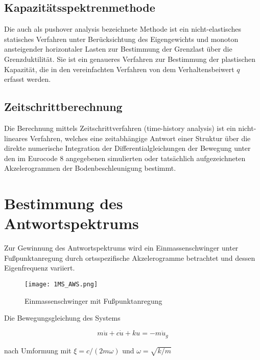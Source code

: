 \subsection{Kapazitätsspektrenmethode}
\label{sec:Kapazitaetsspektrenmethode}

Die auch als \glqq pushover analysis\grqq{} bezeichnete Methode ist ein nicht-elastisches statisches Verfahren unter Berücksichtung des Eigengewichts und monoton ansteigender horizontaler Lasten zur Bestimmung der Grenzlast über die Grenzduktilität.
Sie ist ein genaueres Verfahren zur Bestimmung der plastischen Kapazität, die in den vereinfachten Verfahren von dem Verhaltensbeiwert $q$ erfasst werden.

\subsection{Zeitschrittberechnung}
\label{sec:Zeitschrittberechnung}

Die Berechnung mittels Zeitschrittverfahren (\glqq time-history analysis\grqq{}) ist ein nicht-lineares Verfahren, welches eine zeitabhängige Antwort einer Struktur über die direkte numerische Integration der Differentialgleichungen der Bewegung unter den im Eurocode 8 angegebenen simulierten oder tatsächlich aufgezeichneten Akzelerogrammen der Bodenbeschleunigung bestimmt. 

\pagebreak

\section{Bestimmung des Antwortspektrums}
\label{sec:Antwortspektren}

Zur Gewinnung des Antwortspektrums wird ein Einmassenschwinger unter Fußpunktanregung durch ortsspezifische Akzelerogramme betrachtet und dessen Eigenfrequenz variiert.

\begin{figure}[H]
    \centering
    \texttt{[image: 1MS\_AWS.png]}
    \caption{Einmassenschwinger mit Fußpunktanregung}
\end{figure}

Die Bewegungsgleichung des Systems

\begin{equation} \label{ems_aws}
m \ddot u + c \dot u + k u = -m \ddot u_g
\end{equation}

nach Umformung mit $\xi = c/(2m\omega)$ und $\omega = \sqrt{k/m}$

